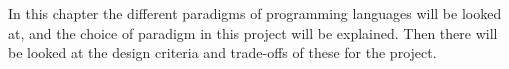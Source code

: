 In this chapter the different paradigms of programming languages will be looked at, and the choice of paradigm in this project will be explained. Then there will be looked at the design criteria and trade-offs of these for the project.